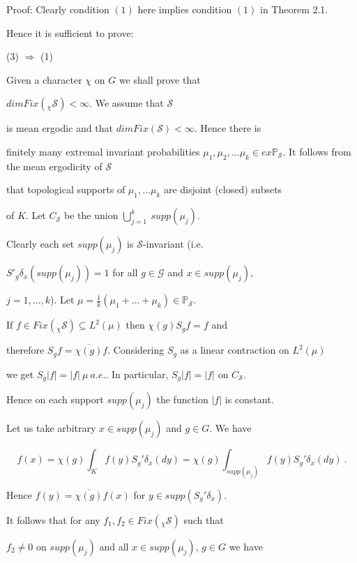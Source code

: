 \documentclass{amsart}
\theoremstyle{definition}
\theoremstyle{remark}
\numberwithin{equation}{section}
\begin{document}
Proof: Clearly condition $(1)$ here implies condition $(1)$ in Theorem 2.1.

Hence it is sufficient to prove:



(3) $ \Rightarrow$ (1)

Given a character $\chi $ on $G$ we shall  prove that

$dim Fix(_{\chi}\mathcal{S}) < \infty$. We assume that $\mathcal{S}$

is mean ergodic and that $dim Fix(\mathcal{S}) < \infty$. Hence there is

finitely many  extremal invariant probabilities  $\mu_1, \mu_2, \dots \mu_k

\in ex \mathbb{P}_{\mathcal{S}}$. It follows from the mean ergodicity of $\mathcal{S}$

that topological supports of $\mu_1, \dots \mu_k$ are disjoint (closed) subsets

of $K$. Let $C_{\mathcal{S}}$ be the union $\bigcup_{j=1}^k \ supp(\mu _j)$.

Clearly each set $supp(\mu_j)$ is $\mathcal{S}$-invariant (i.e.

$S'_g \delta_x (supp (\mu_j)) = 1$ for all $g\mathcal{\in G}$ and $x\in supp(\mu_j)$,

$j =1, ... , k$). Let $\mu = \frac{1}{k}(\mu_1 + ... + \mu_k) \in \mathbb{P}_{\mathcal{S}}$.

If $f\in Fix(_{\chi}\mathcal{S})\subseteq L^2(\mu )$ then $\chi(g)S_gf = f $ and

therefore $S_gf = \overline{\chi(g)}f$. Considering $S_g$ as a linear contraction on $L^2(\mu )$

we get $S_g|f| = |f| \ \mu \ a.e.$. In particular, $S_g|f| = |f|$ on  $C_{\mathcal{S}}$.

Hence on each support $supp(\mu_j)$ the function $|f|$ is constant.

Let us take arbitrary $x\in supp(\mu_j)$  and $g\in G$. We have

$$

f(x) =  \chi(g)\int_K f(y) S_g'\delta_x(dy) = \chi(g)\int_{supp(\mu_j)} f(y) S_g'\delta_x(dy) \ .

$$

Hence $f(y) = \overline{\chi(g)}f(x)$ for $y \in supp(S_g'\delta_x)$.

It follows that for  any $f_1, f_2 \in Fix(_{\chi}\mathcal{S})$ such that

$f_2 \neq 0$ on $supp(\mu_j)$ and all $x\in supp(\mu_j)$, $g\in G$ we have
\end{document}
